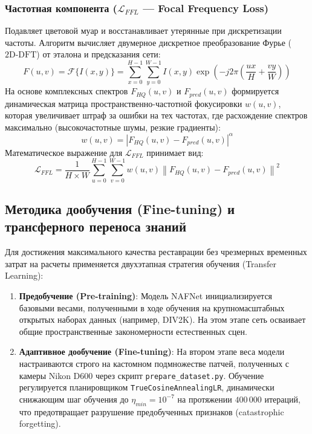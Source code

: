 \documentclass[12pt,a4paper]{article}
\begin{document}
\subsubsection{Частотная компонента ($\mathcal{L}_{FFL}$ --- Focal Frequency Loss)}
Подавляет цветовой муар и восстанавливает утерянные при дискретизации частоты. Алгоритм вычисляет двумерное дискретное преобразование Фурье ($\text{2D-DFT}$) от эталона и предсказания сети:
\begin{equation}
    F(u,v) = \mathcal{F}\{I(x,y)\} = \sum_{x=0}^{H-1}\sum_{y=0}^{W-1} I(x,y) \exp\left( -j2\pi \left( \frac{ux}{H} + \frac{vy}{W} \right) \right)
\end{equation}
На основе комплексных спектров $F_{HQ}(u,v)$ и $F_{pred}(u,v)$ формируется динамическая матрица пространственно-частотной фокусировки $w(u,v)$, которая увеличивает штраф за ошибки на тех частотах, где расхождение спектров максимально (высокочастотные шумы, резкие градиенты):
\begin{equation}
    w(u,v) = \left| F_{HQ}(u,v) - F_{pred}(u,v) \right|^\alpha
\end{equation}
Математическое выражение для $\mathcal{L}_{FFL}$ принимает вид:
\begin{equation}
    \mathcal{L}_{FFL} = \frac{1}{H \times W}\sum_{u=0}^{H-1}\sum_{v=0}^{W-1} w(u,v) \left\| F_{HQ}(u,v) - F_{pred}(u,v) \right\|^2
\end{equation}

\subsection{Методика дообучения (Fine-tuning) и трансферного переноса знаний}
Для достижения максимального качества реставрации без чрезмерных временных затрат на расчеты применяется двухэтапная стратегия обучения (Transfer Learning):
\begin{enumerate}
    \item \textbf{Предобучение (Pre-training)}: Модель NAFNet инициализируется базовыми весами, полученными в ходе обучения на крупномасштабных открытых наборах данных (например, DIV2K). На этом этапе сеть осваивает общие пространственные закономерности естественных сцен.
    \item \textbf{Адаптивное дообучение (Fine-tuning)}: На втором этапе веса модели настраиваются строго на кастомном подмножестве патчей, полученных с камеры Nikon D600 через скрипт \texttt{prepare\_dataset.py}. Обучение регулируется планировщиком \texttt{TrueCosineAnnealingLR}, динамически снижающим шаг обучения до $\eta_{min}=10^{-7}$ на протяжении $400\,000$ итераций, что предотвращает разрушение предобученных признаков (catastrophic forgetting).
\end{enumerate}
\end{document}
